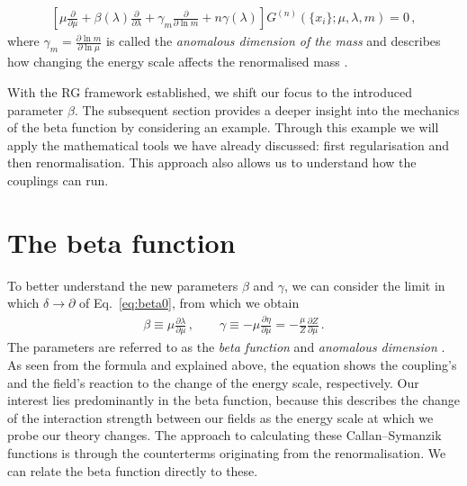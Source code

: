 \begin{align}
     \left[\mu\frac{\partial}{\partial \mu}  + \beta(\lambda) \frac{\partial}{\partial \lambda} +\gamma_m\frac{\partial }{\partial \ln m}+ n\gamma(\lambda) \right]G^{(n)}(\{x_i\};\mu,\lambda, m)=0\,,
\end{align}
where $\gamma_m=\frac{\partial \ln m}{\partial \ln \mu}$ is called the \textit{anomalous dimension of the mass} and describes how changing the energy scale affects the renormalised mass \cite{Srednicki2007}. 

With the RG framework established, we shift our focus to the introduced parameter $\beta$. The subsequent section provides a deeper insight into the mechanics of the beta function by considering an example. Through this example we will apply the mathematical tools we have already discussed: first regularisation and then renormalisation. This approach also allows us to understand how the couplings can run.

\section{The beta function} \label{sec:betafunc}
To better understand the new parameters $\beta$ and $\gamma$, we can consider the limit in which $\delta\to\partial$ of Eq.~\eqref{eq:beta0}, from which we obtain
\begin{align}
    \beta\equiv \mu\frac{\partial \lambda}{\partial\mu}\,, \qquad  \gamma\equiv- \mu\frac{\partial\eta}{\partial\mu}=-\frac{\mu}{Z}\frac{\partial Z}{\partial \mu}\,.\label{eq:betafunc}
\end{align}
The parameters are referred to as the \textit{beta function} and \textit{anomalous dimension} \cite{Pernow:2021fvb}. As seen from the formula and explained above, the equation shows the coupling's and the field's reaction to the change of the energy scale, respectively. Our interest lies predominantly in the beta function, because this describes the change of the interaction strength between our fields as the energy scale at which we probe our theory changes. The approach to calculating these Callan--Symanzik functions is through the counterterms originating from the renormalisation. We can relate the beta function directly to these.

